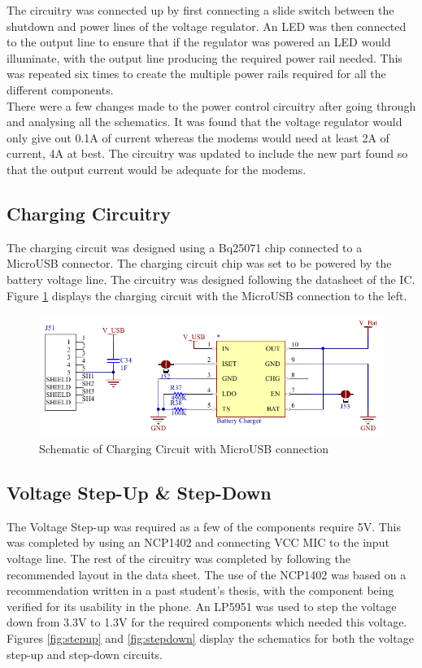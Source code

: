 	The circuitry was connected up by first connecting a slide switch between the shutdown and power lines of the voltage regulator. 
An LED was then connected to the output line to ensure that if the regulator was powered an LED would illuminate, with the output line producing the required power rail needed. 
This was repeated six times to create the multiple power rails required for all the different components.\\

	There were a few changes made to the power control circuitry after going through and analysing all the schematics. 
It was found that the voltage regulator would only give out 0.1A of current whereas the modems would need at least 2A of current, 4A at best. 
The circuitry was updated to include the new part found so that the output current would be adequate for the modems. \\

\subsection{Charging Circuitry}

	The charging circuit was designed using a Bq25071 chip connected to a MicroUSB connector. 
The charging circuit chip was set to be powered by the battery voltage line. The circuitry was designed following the datasheet of the IC.
Figure \ref{fig:charger} displays the charging circuit with the MicroUSB connection to the left. 

\begin{figure}
	\includegraphics[width=0.5\linewidth]{Figures/battery_charger.pdf}\centering
	\caption{Schematic of Charging Circuit with MicroUSB connection}
	\label{fig:charger}
\end{figure}

\subsection{Voltage Step-Up \& Step-Down}

	The Voltage Step-up was required as a few of the components require 5V. 
This was completed by using an NCP1402 and connecting VCC MIC to the input voltage line. 
The rest of the circuitry was completed by following the recommended layout in the data sheet. 
The use of the NCP1402 was based on a recommendation written in a past student's thesis, with the component being verified for its usability in the phone. 
An LP5951 was used to step the voltage down from 3.3V to 1.3V for the required components which needed this voltage. 
Figures \ref{fig:stepup} and \ref{fig:stepdown} display the schematics for both the voltage step-up and step-down circuits.

